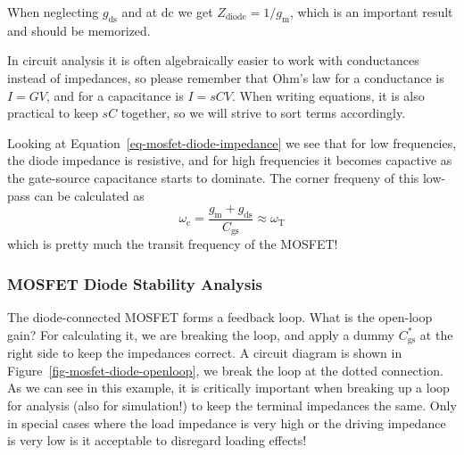 \documentclass[
  a4paper,
  DIV=11,
  numbers=noendperiod]{scrartcl}
\begin{document}
When neglecting \(g_\mathrm{ds}\) and at dc we get
\(Z_\mathrm{diode} = 1 / g_\mathrm{m}\), which is an important result
and should be memorized.

\begin{tcolorbox}[enhanced jigsaw, opacitybacktitle=0.6, colback=white, left=2mm, toptitle=1mm, opacityback=0, rightrule=.15mm, bottomrule=.15mm, breakable, arc=.35mm, toprule=.15mm, colframe=quarto-callout-important-color-frame, colbacktitle=quarto-callout-important-color!10!white, bottomtitle=1mm, titlerule=0mm, coltitle=black, leftrule=.75mm, title=\textcolor{quarto-callout-important-color}{\faExclamation}\hspace{0.5em}{Important}]

In circuit analysis it is often algebraically easier to work with
conductances instead of impedances, so please remember that Ohm's law
for a conductance is \(I = G V\), and for a capacitance is
\(I = s C V\). When writing equations, it is also practical to keep
\(s C\) together, so we will strive to sort terms accordingly.

\end{tcolorbox}

Looking at Equation~\ref{eq-mosfet-diode-impedance} we see that for low
frequencies, the diode impedance is resistive, and for high frequencies
it becomes capactive as the gate-source capacitance starts to dominate.
The corner frequeny of this low-pass can be calculated as \[
\omega_\mathrm{c} = \frac{g_\mathrm{m}+ g_\mathrm{ds}}{C_\mathrm{gs}} \approx \omega_\mathrm{T}
\] which is pretty much the transit frequency of the MOSFET!

\subsubsection{MOSFET Diode Stability
Analysis}\label{mosfet-diode-stability-analysis}

The diode-connected MOSFET forms a feedback loop. What is the open-loop
gain? For calculating it, we are breaking the loop, and apply a dummy
\(C_\mathrm{gs}^{*}\) at the right side to keep the impedances correct.
A circuit diagram is shown in Figure~\ref{fig-mosfet-diode-openloop}, we
break the loop at the dotted connection. As we can see in this example,
it is critically important when breaking up a loop for analysis (also
for simulation!) to keep the terminal impedances the same. Only in
special cases where the load impedance is very high or the driving
impedance is very low is it acceptable to disregard loading effects!
\end{document}
